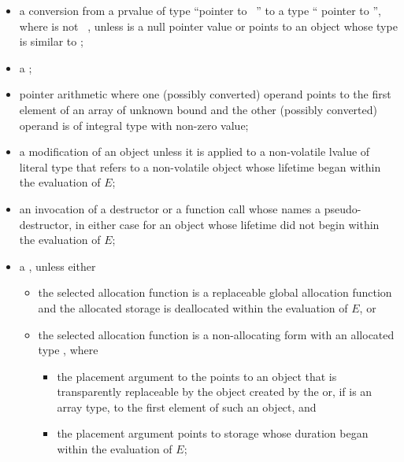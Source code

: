 \begin{itemize}
\begin{note}
\begin{example}
\begin{codeblock}
// OK to capture objects with automatic storage duration created during constant expression evaluation.
static_assert(bind(monad(2))(monad)() == monad(2)());
\end{codeblock}
\end{example}
\end{note}

\item
a conversion
from a prvalue  of type ``pointer to \cv{}~''
to a type `` pointer to  '',
where   is not ~,
unless 
is a null pointer value or
points to an object whose type is similar to ;

\item
a ;

\item
pointer arithmetic where
one (possibly converted) operand
points to the first element of an array of unknown bound and
the other (possibly converted) operand
is of integral type with non-zero value;

\item
a modification of an object
unless it is applied to a non-volatile lvalue of literal type
that refers to a non-volatile object
whose lifetime began within the evaluation of $E$;

\item
an invocation of a destructor or a function call
whose  names a pseudo-destructor,
in either case for an object whose lifetime did not begin within the evaluation of $E$;

\item
a ,
unless either
\begin{itemize}
\item
the selected allocation function is
a replaceable global allocation function and
the allocated storage is deallocated within the evaluation of $E$, or
\item
the selected allocation function is
a non-allocating form
with an allocated type , where
\begin{itemize}
\item
the placement argument to the  points
to an object that is transparently replaceable by
the object created by the 
or, if  is an array type,
to the first element of such an object, and
\item
the placement argument points to storage
whose duration began within the evaluation of $E$;
\end{itemize}
\end{itemize}


\end{itemize}
